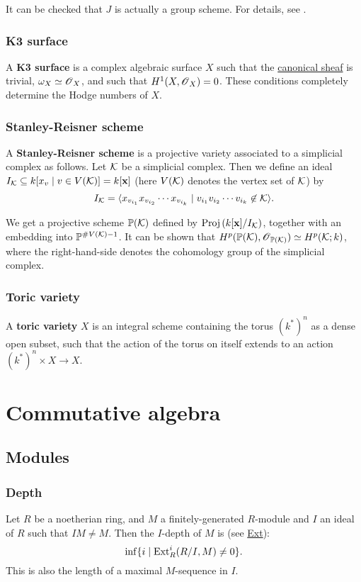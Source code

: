 \documentclass[11pt, english]{article}
\begin{document}
It can be checked that $J$ is actually a group scheme. For details, see \cite[Ch. IV.4]{hartshorne}.

\subsubsection{K3 surface}
\label{k3}

A \textbf{K3 surface} is a complex algebraic surface $X$ such that the \hyperref[canonicaldivisor]{canonical sheaf} is trivial, $\omega_X \simeq \operatorname{\mathscr{O}}_X$, and such that $H^1(X,\operatorname{\mathscr{O}}_X)=0$. These conditions completely determine the Hodge numbers of $X$.

\subsubsection{Stanley-Reisner scheme}
\label{srscheme}

A \textbf{Stanley-Reisner scheme} is a projective variety associated to a simplicial complex as follows. Let $\mathcal K$ be a simplicial complex. Then we define an ideal $I_\mathcal K \subseteq k[x_v \mid v \in V(\mathcal K)] = k[\mathbf x]$ (here $V(\mathcal K)$ denotes the vertex set of $\mathcal K$) by
\[
I_\mathcal K = \langle x_{v_{i_1}}x_{v_{i_2}}\cdots x_{v_{i_k}} \mid v_{i_1}v_{i_2}\cdots v_{i_k} \not \in \mathcal K \rangle.
\]

We get a projective scheme $\mathbb{P}(\mathcal K)$ defined by $\operatorname{Proj} \left (k[ \mathbf x]/I_\mathcal K \right)$, together with an embedding into $\mathbb{P}^{\# V(\mathcal K)-1}$. It can be shown that $H^p(\mathbb{P}(\mathcal K),\operatorname{\mathscr{O}}_{\mathbb{P}(\mathcal K)}) \simeq H^p(\mathcal K;k)$, where the right-hand-side denotes the cohomology group of the simplicial complex.

\subsubsection{Toric variety}
\label{toricvariety}

A \textbf{toric variety} $X$ is an integral scheme containing the torus $(k^\ast)^n$ as a dense open subset, such that the action of the torus on itself extends to an action $(k^\ast)^n \times X \to X$.

\section{Commutative algebra}
\subsection{Modules}
\subsubsection{Depth}
Let $R$ be a noetherian ring, and $M$ a finitely-generated $R$-module and $I$ an ideal of $R$ such that $IM \neq M$. Then the $I$-depth of $M$ is (see \hyperref[ext]{Ext}): \[\inf\{i \mid \operatorname{\mathrm{Ext}}^i_R(R/I,M) \neq 0\}.\]
This is also the length of a maximal $M$-sequence in $I$.
\end{document}
